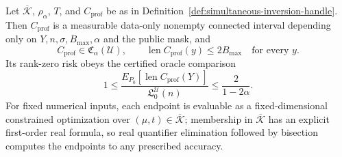 Let \(\overline{\mathcal K}\), \(\rho_\alpha\), \(T\), and \(C_{\mathrm{prof}}\) be as in Definition~\ref{def:simultaneous-inversion-handle}.  Then \(C_{\mathrm{prof}}\) is a measurable data-only nonempty connected interval depending only on \(Y,n,\sigma,B_{\max},\alpha\) and the public mask, and
\[
 C_{\mathrm{prof}}\in\mathfrak C_\alpha(\mathcal U),
 \qquad
 \operatorname{len}C_{\mathrm{prof}}(y)\leq2B_{\max}\quad\text{for every }y.
\]
Its rank-zero risk obeys the certified oracle comparison
\[
 1\leq
 \frac{E_{P_0}[\operatorname{len}C_{\mathrm{prof}}(Y)]}
 {\mathfrak L_0^{\mathcal U}(n)}
 \leq\frac{2}{1-2\alpha}.
\]
For fixed numerical inputs, each endpoint is evaluable as a fixed-dimensional constrained optimization over \((\mu,t)\in\overline{\mathcal K}\); membership in \(\overline{\mathcal K}\) has an explicit first-order real formula, so real quantifier elimination followed by bisection computes the endpoints to any prescribed accuracy.